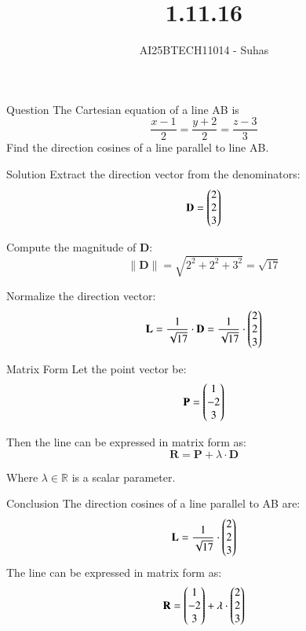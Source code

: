 \documentclass{beamer}
\title{1.11.16}
\author{AI25BTECH11014 - Suhas}
\begin{document}
\frame{\titlepage}

\begin{frame}{Question}
The Cartesian equation of a line AB is  
\[
\frac{x - 1}{2} = \frac{y + 2}{2} = \frac{z - 3}{3}
\]  
Find the direction cosines of a line parallel to line AB.
\end{frame}

\begin{frame}{Solution}
Extract the direction vector from the denominators:
\begin{equation}
\mathbf{D} = \begin{pmatrix}2\\2\\3\end{pmatrix}
\end{equation}

Compute the magnitude of \(\mathbf{D}\):
\begin{equation}
\|\mathbf{D}\| = \sqrt{2^2 + 2^2 + 3^2} = \sqrt{17}
\end{equation}

Normalize the direction vector:
\begin{equation}
\mathbf{L} = \frac{1}{\sqrt{17}} \cdot \mathbf{D} = \frac{1}{\sqrt{17}} \cdot \begin{pmatrix}2\\2\\3\end{pmatrix}
\end{equation}
\end{frame}

\begin{frame}{Matrix Form}
Let the point vector be:
\begin{equation}
\mathbf{P} = \begin{pmatrix}1\\-2\\3\end{pmatrix}
\end{equation}

Then the line can be expressed in matrix form as:
\begin{equation}
\mathbf{R} = \mathbf{P} + \lambda \cdot \mathbf{D}
\end{equation}

Where \(\lambda \in \mathbb{R}\) is a scalar parameter.
\end{frame}


\begin{frame}{Conclusion}
The direction cosines of a line parallel to AB are:
\[
\mathbf{L} = \frac{1}{\sqrt{17}} \cdot \begin{pmatrix}2\\2\\3\end{pmatrix}
\]
The line can be expressed in matrix form as:
\[
\mathbf{R} = \begin{pmatrix}1\\-2\\3\end{pmatrix} + \lambda \cdot \begin{pmatrix}2\\2\\3\end{pmatrix}
\]
\end{frame}
\end{document}
